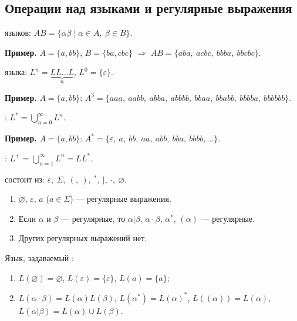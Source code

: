 \documentclass[11pt,a4paper]{article}
\begin{document}
\subsection{Операции над языками и регулярные выражения}

\begin{opr}
 языков: $AB=\{\alpha\beta\mid\alpha\in A,\ \beta\in B\}$.
\end{opr}
\textbf{Пример.} $A=\{a,bb\}$, $B=\{ba,cbc\}$ $\Rightarrow$ $AB=\{aba,\ acbc,\ bbba,\ bbcbc\}$.

\begin{opr}
 языка: $L^n=\underbrace{LL\dots L}_{n}$, $L^0=\{\varepsilon\}$.
\end{opr}
\textbf{Пример.} $A=\{a,bb\}$: $A^3=\{aaa,\ aabb,\ abba,\ abbbb,\ bbaa,\ bbabb,\ bbbba,\ bbbbbb\}$.

\begin{opr}
: $L^*=\bigcup\limits_{n=0}^{\infty}L^n$.
\end{opr}
\textbf{Пример.} $A=\{a,bb\}$: $A^*=\{\varepsilon,\ a,\ bb,\ aa,\ abb,\ bba,\ bbbb,\dots\}$.

\begin{opr}
: $L^+=\bigcup\limits_{n=1}^{\infty}L^n=LL^*$.
\end{opr}

\begin{opr}
 состоит из: $\varepsilon,\ \Sigma,\ (,\ ),\ ^*,\ |,\ \cdot,\ \varnothing$.
\begin{enumerate}
\item $\varnothing$, $\varepsilon$, $a$ ($a\in\Sigma$) — регулярные выражения.
\item Если $\alpha$ и $\beta$ — регулярные, то $\alpha|\beta$, $\alpha\cdot\beta$, $\alpha^*$, $(\alpha)$ — регулярные.
\item Других регулярных выражений нет.
\end{enumerate}
\end{opr}

\begin{opr}
Язык, задаваемый :
\begin{enumerate}
\item $L(\varnothing)=\varnothing$, \quad $L(\varepsilon)=\{\varepsilon\}$, \quad $L(a)=\{a\}$;
\item $L(\alpha\cdot\beta)=L(\alpha)L(\beta)$, \quad $L(\alpha^*)=L(\alpha)^*$, \quad $L((\alpha))=L(\alpha)$, \quad $L(\alpha|\beta)=L(\alpha)\cup L(\beta)$.
\end{enumerate}
\end{opr}
\end{document}
